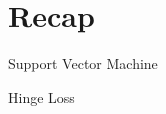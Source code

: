 \section{Recap}

\begin{frame}
\begin{block}{Support Vector Machine}
    
\end{block}
\end{frame}

\begin{frame}
\begin{block}{Hinge Loss}
\end{block}
\end{frame}

